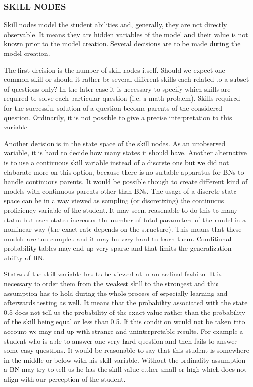 \subsubsection{SKILL NODES}
Skill nodes model the student abilities and, generally, they are not directly observable. It means they are hidden variables of the model and their value is not known prior to the model creation. Several decisions are to be made during the model creation.
 
The first decision is the number of skill nodes itself. Should we expect one common skill or should it rather be several different skills each related to a subset of questions only? In the later case it is necessary to specify which skills are required to solve each particular question (i.e. a math problem). 
Skills required for the successful solution of a question become parents of the considered question.
Ordinarily, it is not possible to give a precise interpretation to this variable. 

Another decision is in the state space of the skill nodes. As an unobserved variable, it is hard to decide how many states it should have. Another alternative is to use a continuous skill variable instead of a discrete one but we did not elaborate more 
on this option, because there is no suitable apparatus for BNs to handle continuous parents. It would be possible though to create different kind of models with continuous parents other than BNs. The usage of a discrete state space can be in a way viewed as sampling (or discretizing) the continuous proficiency variable of the student. It may seem reasonable to do this to many states but each states increases the number of total parameters of the model in a nonlinear way (the exact rate depends on the structure). This means that these models are too complex and it may be very hard to learn them. Conditional probability tables may end up very sparse and that limits the generalization ability of BN. 

States of the skill variable has to be viewed at in an ordinal fashion. It is necessary to order them from the weakest skill to the strongest and this assumption has to hold during the whole process of especially learning and afterwards testing as well. It means that the probability associated with the state 0.5 does not tell us the probability of the exact value rather than the probability of the skill being equal or less than 0.5. If this condition would not be taken into account we may end up with strange and uninterpretable results. For example a student who is able to answer one very hard question and then fails to answer some easy questions. It would be reasonable to say that this student is somewhere in the middle or below with his skill variable. Without the ordinality assumption a BN may try to tell us he has the skill value either small or high which does not align with our perception of the student.

